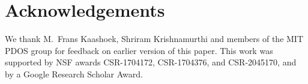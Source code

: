 \section*{Acknowledgements}

We thank M.\ Frans Kaashoek, Shriram Krishnamurthi and
members of the MIT PDOS group for feedback on earlier
version of this paper.
%
This work was supported by NSF awards CSR-1704172, CSR-1704376, and
CSR-2045170, and by a Google Research Scholar Award.
%
